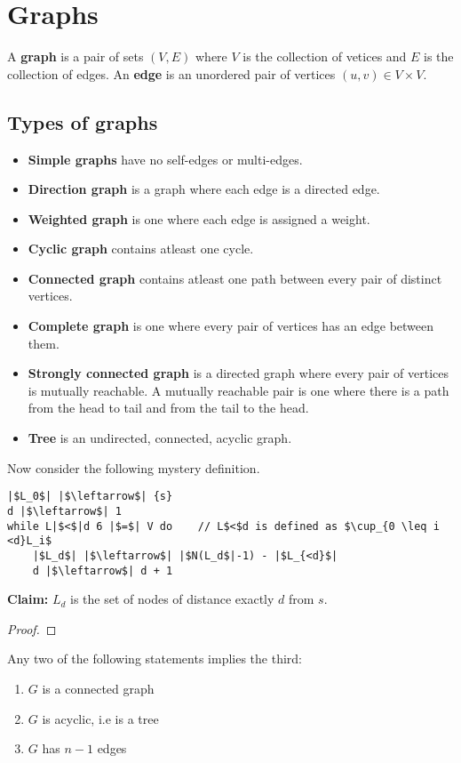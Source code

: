 \documentclass{tufte-handout}
\theoremstyle{definition}
\begin{document}
\section{Graphs}
A \textbf{graph} is a pair of sets $(V,E)$  where $V$ is the collection of vetices and $E$ is the collection of edges. An \textbf{edge} is an unordered pair of vertices $(u,v) \in V \times V$.

\subsection*{Types of graphs}
\begin{itemize}
    \item \textbf{Simple graphs} have no self-edges or multi-edges.
    \item \textbf{Direction graph} is a graph where each edge is a directed edge.
    \item \textbf{Weighted graph} is one where each edge is assigned a weight.
    \item \textbf{Cyclic graph} contains atleast one cycle.
    \item \textbf{Connected graph} contains atleast one path between every pair of distinct vertices.
    \item \textbf{Complete graph} is one where every pair of vertices has an edge between them.
    \item \textbf{Strongly connected graph} is a directed graph where every pair of vertices is mutually reachable. A mutually reachable pair is one where there is a path from the head to tail and from the tail to the head.
    \item \textbf{Tree} is an undirected, connected, acyclic graph.
\end{itemize}

Now consider the following mystery definition. 
\begin{verbatim}
|$L_0$| |$\leftarrow$| {s}
d |$\leftarrow$| 1
while L|$<$|d 6 |$=$| V do    // L$<$d is defined as $\cup_{0 \leq i <d}L_i$
    |$L_d$| |$\leftarrow$| |$N(L_d$|-1) - |$L_{<d}$|
    d |$\leftarrow$| d + 1
\end{verbatim}

\textbf{Claim:} $L_d$ is the set of nodes of distance exactly $d$ from $s$.
\begin{proof}
    
\end{proof}

\begin{theorem}
    Any two of the following statements implies the third:
    \begin{enumerate}
        \item $G$ is a connected graph
        \item $G$ is acyclic, i.e is a tree
        \item $G$ has $n-1$ edges
    \end{enumerate}
\end{theorem}
\end{document}
